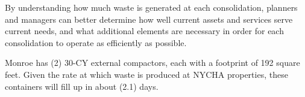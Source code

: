 
    By understanding how much waste is generated at each consolidation, planners and managers
    can better determine how well current assets and services serve current needs, and what additional 
    elements are necessary in order for each consolidation to operate as efficiently as possible. 

    Monroe has (2) 30-CY external compactors, each with a footprint of 192 square feet. Given the rate at which waste is produced at NYCHA properties, these containers will fill
    up in about (2.1) days.